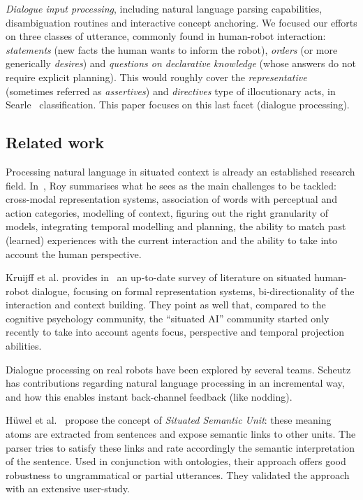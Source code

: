 \begin{inparaenum}[\itshape 1)]
\item \emph{Dialogue input processing}, including natural language parsing
capabilities, disambiguation routines and interactive concept anchoring. We
focused our efforts on three classes of utterance, commonly found in
human-robot interaction: \emph{statements} (\ie new facts the human wants to
inform the robot), \emph{orders} (or more generically \emph{desires}) and
\emph{questions on declarative knowledge} (whose answers do not require
explicit planning). This would roughly cover the \emph{representative}
(sometimes referred as \emph{assertives}) and \emph{directives} type of
illocutionary acts, in Searle~\cite{Searle1976} classification. This paper
focuses on this last facet (dialogue processing).

\end{inparaenum}

\subsection{Related work}

Processing natural language in situated context is already an established
research field. In~\cite{Roy2005}, Roy summarises what he sees as the main
challenges to be tackled: cross-modal representation systems, association of
words with perceptual and action categories, modelling of context, figuring out
the right granularity of models, integrating temporal modelling and planning,
the ability to match past (learned) experiences with the current interaction
and the ability to take into account the human perspective.

Kruijff et al. provides in~\cite{Kruijff2010} an up-to-date survey of literature
on situated human-robot dialogue, focusing on formal representation systems,
bi-directionality of the interaction and context building. They point as well
that, compared to the cognitive psychology community, the ``situated AI''
community started only recently to take into account agents focus, perspective and temporal
projection abilities.

Dialogue processing on real robots have been explored by several teams.
Scheutz~\cite{Brick2007} has contributions regarding natural language
processing in an incremental way, and how this enables instant back-channel
feedback (like nodding).

Hüwel et al.~\cite{Huwel2006} propose the concept of \textit{Situated Semantic
Unit}: these meaning atoms are extracted from sentences and expose semantic
links to other units. The parser tries to satisfy these links and rate
accordingly the semantic interpretation of the sentence. Used in conjunction
with ontologies, their approach offers good robustness to ungrammatical or
partial utterances. They validated the approach with an extensive user-study.

